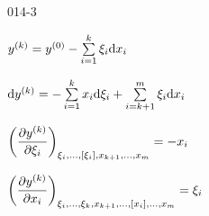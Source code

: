 \begin{mitframe}{014-3}

    
\begin{listone}
        
    \item $y^{(k)}=y^{(\init)}-\sum\limits_{\state=1}^{k}\conjcoortwo_{\state}\mathrm{d}\conjcoor$
    
        
	\item $\mathrm{d}y^{(k)}=-\sum\limits_{\state=1}^{k}\conjcoor\mathrm{d}\conjcoortwo_{\state}+\sum\limits_{\state=k+1}^{m}\conjcoortwo_{\state}\mathrm{d}\conjcoor$ 
         
         
	\item $\bigg(\dfrac{\partial y^{(k)}}{\partial\conjcoortwo_{\state}}\bigg)_{\conjcoortwo_{\state},...,[\conjcoortwo_{\state}],x_{k+1},...,x_{m}}=-\conjcoor$
    
	\item $\bigg(\dfrac{\partial y^{(k)}}{\partial\conjcoor}\bigg)_{\conjcoortwo_{\state},...,\conjcoortwo_{k},x_{k+1},...,[x_{\state}],...,x_{m}}=\conjcoortwo_{\state}$
        
\end{listone}			

\end{mitframe}
